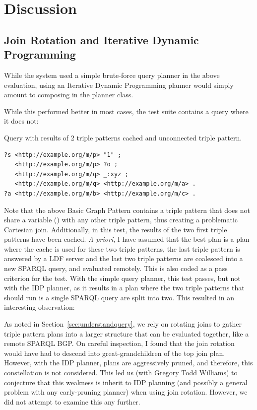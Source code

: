 \section{Discussion}

\subsection{Join Rotation and Iterative Dynamic
  Programming}

While the system used a simple brute-force query planner in the above
evaluation, using an Iterative Dynamic Programming planner
\cite{Kossmann:2000:IDP:352958.352982} would simply amount to
composing  in the planner class.

While this performed better in most cases, the test suite contains a
query where it does not:
\begin{example}{Query with results of 2 triple patterns cached and
    unconnected triple pattern.}
\begin{verbatim}
?s <http://example.org/m/p> "1" ;
   <http://example.org/m/p> ?o ;
   <http://example.org/m/q> _:xyz ;
   <http://example.org/m/q> <http://example.org/m/a> .
?a <http://example.org/m/b> <http://example.org/m/c> .
\end{verbatim}
\end{example}
Note that the above Basic Graph Pattern contains a triple pattern that
does not share a variable () with any other triple pattern,
thus creating a problematic Cartesian join. Additionally, in this
test, the results of the two first triple patterns have been
cached. \textit{A priori}, I have assumed that the best plan is a plan
where the cache is used for these two triple patterns, the last triple
pattern is answered by a LDF server and the last two
triple patterns are coalesced into a new SPARQL query, and evaluated
remotely. This is also coded as a pass criterion for the test. With
the simple query planner, this test passes, but not with the IDP
planner, as it results in a plan where the two triple patterns that
should run is a single SPARQL query are split into two. This resulted
in an interesting observation:

As noted in Section~\ref{sec:understandquery}, we rely on rotating joins
to gather triple pattern plans into a larger structure that can be
evaluated together, like a remote SPARQL BGP. On careful inspection, I
found that the join rotation would have had to descend into
great-grandchildren of the top join plan. However, with the IDP
planner, plans are aggressively pruned, and therefore, this
constellation is not considered. This led us (with Gregory Todd
Williams) to conjecture that this weakness is inherit to IDP planning
(and possibly a general problem with any early-pruning planner) 
when using join rotation. However, we did not attempt to examine this any
further.

